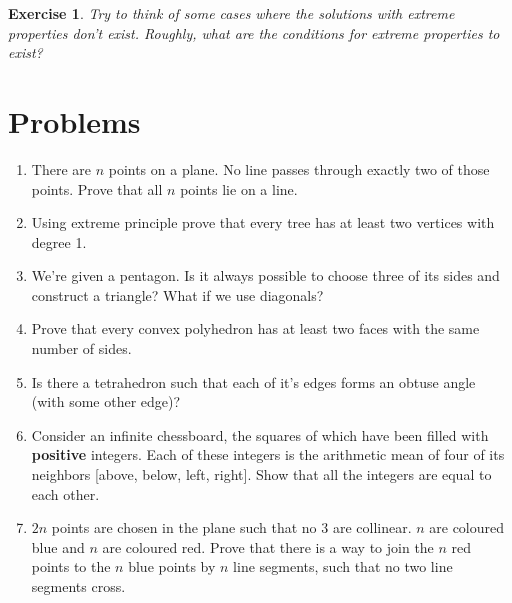 \documentclass{article}
\newtheorem{exercise}{Exercise}
\begin{document}
\begin{exercise}
Try to think of some cases where the solutions with extreme properties \emph{don't} exist. Roughly, what are the conditions for extreme properties to exist?
\end{exercise}

\section{Problems}

\begin{enumerate}

	\item{There are $n$ points on a plane. No line passes through exactly two of those points. Prove that all $n$ points lie on a line.}

	\item{Using extreme principle prove that every tree has at least two vertices with degree 1.}

	\item{We're given a pentagon. Is it always possible to choose three of its sides and construct a triangle? What if we use diagonals?}

	\item{Prove that every convex polyhedron has at least two faces with the same number of sides.}

	\item{Is there a tetrahedron such that each of it's edges forms an obtuse angle (with some other edge)?}

	\item{Consider an infinite chessboard, the squares of which have been filled with \textbf{positive} integers. Each of these integers is the arithmetic mean of four of its neighbors [above, below, left, right]. Show that all the integers are equal to each other.}

	\item{$2n$ points are chosen in the plane such that no $3$ are collinear. $n$ are coloured blue and $n$ are coloured red. Prove that there is a way to join the $n$ red points to the $n$ blue points by $n$ line segments, such that no two line segments cross.}



\end{enumerate}
\end{document}
